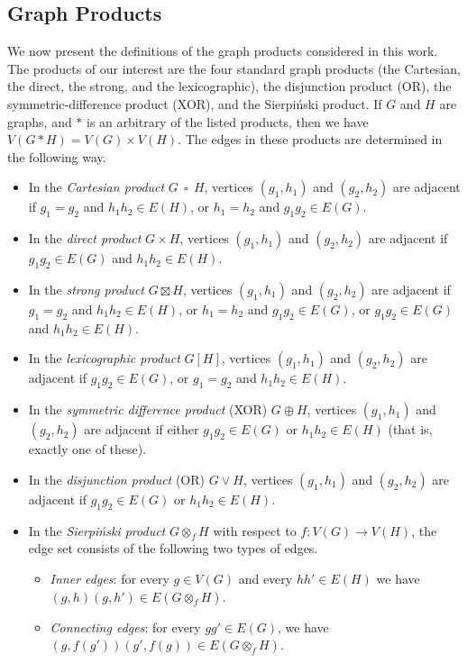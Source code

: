 \documentclass[letterpaper,12pt]{article}
\DeclareMathOperator{\cp}{\,\square\,}
\begin{document}
\subsection{Graph Products}

We now present the definitions of the graph products considered in this work. The products of our interest are the four standard graph products (the Cartesian, the direct, the strong, and the lexicographic), the disjunction product (OR), the symmetric-difference product (XOR), and the Sierpi\'{n}ski product. If $G$ and $H$ are graphs, and $\ast$ is an arbitrary of the listed products, then we have $V(G\ast H) = V(G)\times V(H)$. The edges in these products are determined in the following way. 

\begin{itemize}
\item In the {\em Cartesian product} $G \cp H$, vertices $(g_1,h_1)$ and $(g_2,h_2)$ are adjacent if $g_1 = g_2$ and $h_1h_2 \in E(H)$, or $h_1 = h_2$ and $g_1g_2 \in E(G)$.
\item In the {\em direct product} $G\times H$, vertices $(g_1,h_1)$ and $(g_2,h_2)$ are adjacent if $g_{1}g_{2}\in E(G)$ and $h_{1}h_{2}\in E(H)$. 
\item In the {\em strong product} $G \boxtimes H$, vertices $(g_1,h_1)$ and $(g_2,h_2)$ are adjacent if $g_1=g_2$ and $h_1h_2\in E(H)$, or $h_1=h_2$ and $g_1g_2\in E(G)$, or $g_1g_2\in E(G)$ and $h_1h_2\in E(H)$.
\item In the {\em lexicographic product} $G[H]$, vertices $(g_1,h_1)$ and $(g_2,h_2)$ are adjacent if $g_1g_2 \in E(G)$, or $g_1=g_2$ and $h_1h_2\in E(H)$.
\item In the {\em symmetric difference product} (XOR) $G \oplus H$, vertices $(g_1,h_1)$ and $(g_2,h_2)$ are adjacent if either $g_1g_2 \in E(G)$ or $h_1h_2 \in E(H)$ (that is, exactly one of these).
\item In the {\em disjunction product} (OR) $G \vee H$, vertices $(g_1,h_1)$ and $(g_2,h_2)$ are adjacent if $g_1g_2 \in E(G)$ or $h_1h_2 \in E(H)$.
\item In the {\em Sierpi\'{n}ski product} $G\otimes_f H$ with respect to $f:V(G)\to V(H)$, the edge set consists of the following two types of edges. 
\begin{itemize}
\item {\em Inner edges}: for every $g\in V(G)$ and every $hh'\in E(H)$ we have $(g,h)(g,h')\in E(G\otimes_f H)$.
\item {\em Connecting edges}: for every $gg'\in E(G)$, we have $(g,f(g'))(g',f(g))\in E(G\otimes_f H)$.
\end{itemize}
\end{itemize}
\end{document}
